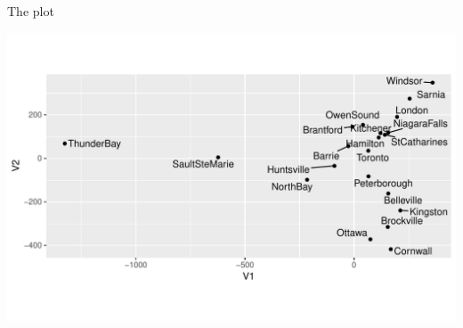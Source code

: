 \begin{frame}[fragile]{The plot}
  
\begin{knitrout}
\color{fgcolor}
\includegraphics[width=\maxwidth]{figure/flimby-1} 

\end{knitrout}
  
  
\end{frame}

